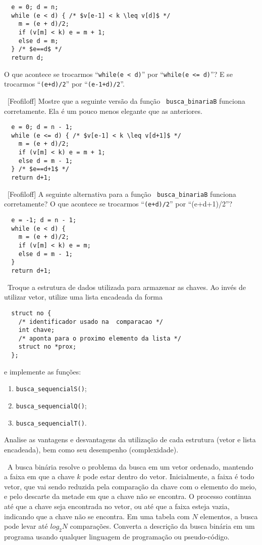 \begin{lstlisting}
  e = 0; d = n;
  while (e < d) { /* $v[e-1] < k \leq v[d]$ */
    m = (e + d)/2;
    if (v[m] < k) e = m + 1;
    else d = m;
  } /* $e==d$ */
  return d;
\end{lstlisting}

\noindent O que acontece se trocarmos ``{\tt while(e < d)}'' por
``{\tt while(e <= d)}''? E se trocarmos ``{\tt (e+d)/2}'' por
``{\tt (e-1+d)/2}''.

\exercise~[Feofiloff] Mostre que a seguinte versão da função {\tt
  busca\_binariaB} funciona corretamente. Ela é um pouco menos
elegante que as anteriores.

\begin{lstlisting}
  e = 0; d = n - 1;
  while (e <= d) { /* $v[e-1] < k \leq v[d+1]$ */
    m = (e + d)/2;
    if (v[m] < k) e = m + 1;
    else d = m - 1;
  } /* $e==d+1$ */
  return d+1;
\end{lstlisting}

\exercise~[Feofiloff] A seguinte alternativa para a função {\tt
  busca\_binariaB} funciona corretamente? O que acontece se trocarmos
``{\tt (e+d)/2}'' por ``(e+d+1)/2''?

\begin{lstlisting}
  e = -1; d = n - 1;
  while (e < d) { 
    m = (e + d)/2;
    if (v[m] < k) e = m;
    else d = m - 1;
  }
  return d+1;
\end{lstlisting}



\exercise~Troque a estrutura de dados utilizada para armazenar as
chaves. Ao invés de utilizar vetor, utilize uma lista encadeada da
forma

\medskip
\begin{lstlisting}
  struct no {
    /* identificador usado na  comparacao */
    int chave;
    /* aponta para o proximo elemento da lista */
    struct no *prox;
  };
\end{lstlisting}
\bigskip

\noindent e implemente as funções:

\begin{enumerate}
\item {\tt busca\_sequencialS()};
\item {\tt busca\_sequencialQ()};
\item {\tt busca\_sequencialT()}.
\end{enumerate}

\noindent Analise as vantagens e desvantagens da utilização de cada
estrutura (vetor e lista encadeada), bem como seu desempenho (complexidade).


\exercise~A busca binária resolve o problema da busca em um vetor
ordenado, mantendo a faixa em que a chave $k$ pode estar dentro do
vetor. Inicialmente, a faixa é todo vetor, que vai sendo reduzida pela
comparação da chave com o elemento do meio, e pelo descarte da metade
em que a chave não se encontra. O processo continua até que a chave
seja encontrada no vetor, ou até que a faixa esteja vazia, indicando
que a chave não se encontra. Em uma tabela com $N$ elementos, a busca
pode levar até $log_2N$ comparações. 
Converta a descrição da busca binária em um programa usando qualquer
linguagem de programação ou pseudo-código.\par
